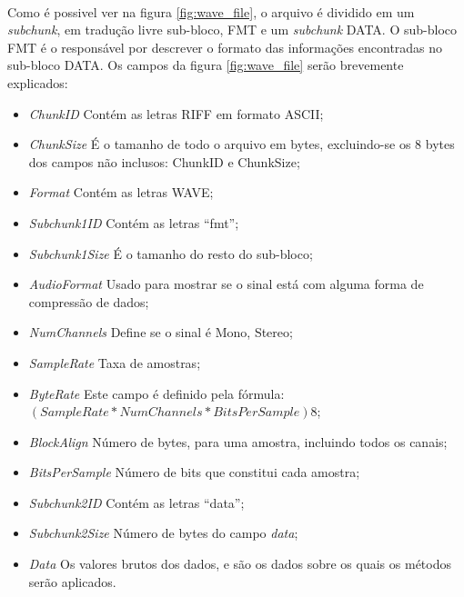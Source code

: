 \documentclass[a4paper,12pt,oneside]{report}
\begin{document}
\\
\par Como \'{e} possivel ver na figura \ref{fig:wave_file}, o arquivo \'{e} dividido em um \emph{subchunk}, em tradu\c{c}\~{a}o livre sub-bloco, FMT e um \emph{subchunk} DATA. O sub-bloco FMT \'{e} o respons\'{a}vel por descrever o formato das informa\c{c}\~{o}es encontradas no sub-bloco DATA. Os campos da figura \ref{fig:wave_file} ser\~{a}o brevemente explicados: 
\begin{itemize}
\item \emph{ChunkID} Cont\'{e}m as letras RIFF em formato ASCII;
\item \emph{ChunkSize} \'{E} o tamanho de todo o arquivo em bytes, excluindo-se os 8 bytes dos campos n\~{a}o inclusos: ChunkID e ChunkSize;
\item \emph{Format} Cont\'{e}m as letras WAVE;
\item \emph{Subchunk1ID} Cont\'{e}m as letras \enquote{fmt}; 
\item \emph{Subchunk1Size} \'{E} o tamanho do resto do sub-bloco;
\item \emph{AudioFormat} Usado para mostrar se o sinal est\'{a} com alguma forma de compress\~{a}o de dados;
\item \emph{NumChannels} Define se o sinal \'{e} Mono, Stereo;
\item \emph{SampleRate} Taxa de amostras;
\item \emph{ByteRate} Este campo \'{e} definido pela f\'{o}rmula:  $(SampleRate * NumChannels * BitsPerSample)8$;
\item \emph{BlockAlign} N\'{u}mero de bytes, para uma amostra, incluindo todos os canais;
\item \emph{BitsPerSample} N\'{u}mero de bits que constitui cada amostra;
\item \emph{Subchunk2ID} Cont\'{e}m as letras \enquote{data};
\item \emph{Subchunk2Size} N\'{u}mero de bytes do campo \emph{data};
\item \emph{Data} Os valores brutos dos dados, e s\~{a}o os dados sobre os quais os m\'{e}todos ser\~{a}o aplicados.
\end{itemize}
\end{document}
